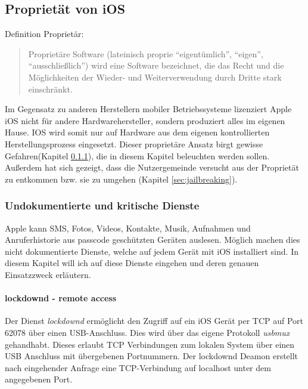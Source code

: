 \subsection{Proprietät von iOS}
	Definition Proprietär:
	\begin{quote}
		Proprietäre Software (lateinisch proprie "`eigentümlich"', "`eigen"',
		"`ausschließlich"') wird eine Software bezeichnet, die das Recht und die
		Möglichkeiten der Wieder- und Weiterverwendung durch Dritte stark einschränkt.
		\cite{WikiProprietary2015}
	\end{quote}
	Im Gegensatz zu anderen Herstellern mobiler Betriebssysteme lizenziert Apple
	iOS nicht für andere Hardwarehersteller, sondern produziert alles im
	eigenen Hause. IOS wird somit nur auf Hardware aus dem eigenen kontrollierten
	Herstellungsprozess eingesetzt. Dieser proprietäre Ansatz birgt gewisse
	Gefahren(Kapitel
	\ref{sec:undocumented-services}), die in diesem Kapitel beleuchten werden
	sollen. Außerdem hat sich gezeigt, dass die Nutzergemeinde versucht aus der
	Proprietät zu entkommen bzw. sie zu umgehen (Kapitel \ref{sec:jailbreaking}).
	
	\subsubsection{Undokumentierte und kritische
	Dienste}\label{sec:undocumented-services}
		Apple kann SMS, Fotos, Videos, Kontakte, Musik, Aufnahmen und Anruferhistorie
		aus passcode geschützten Geräten auslesen. Möglich machen dies nicht
		dokumentierte Dienste, welche auf jedem Gerät mit iOS installiert sind. In
		diesem Kapitel will ich auf diese Dienste eingehen und deren genauen
		Einsatzzweck erläutern.
		\paragraph{lockdownd - remote access}
			Der Dienst \textsl{lockdownd} ermöglicht den Zugriff auf ein iOS Gerät
			per TCP auf Port 62078 über einen USB-Anschluss.
			Dies wird über das eigene Protokoll \textsl{usbmux} gehandhabt. Dieses
			erlaubt TCP Verbindungen zum lokalen System über einen USB Anschluss mit
			übergebenen	Portnummern. Der lockdownd Deamon erstellt nach eingehender
			Anfrage eine TCP-Verbindung auf localhost unter dem angegebenen Port.
